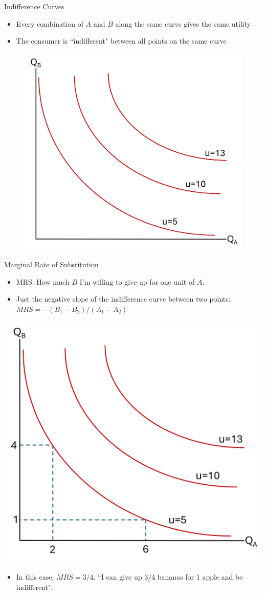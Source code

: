\documentclass[9pt, handout]{beamer}
\begin{document}
\begin{frame}{Indifference Curves}
    \begin{itemize}
        \item Every combination of $A$ and $B$ along the same curve gives the same utility
        \item The consumer is ``indifferent" between all points on the same curve
    \end{itemize}
    \begin{figure}
        \centering
        \includegraphics[width=0.5\linewidth]{indifference_curves.png}
    \end{figure}
\end{frame}

\begin{frame}{Marginal Rate of Substitution}
    \begin{itemize}
        \item MRS:  How much $B$ I'm willing to give up for one unit of $A$.
        \item Just the negative slope of the indifference curve between two points:\\$MRS = -(B_1 - B_2)/(A_1 - A_2)$
    \end{itemize}
    \centering
    \includegraphics[width=0.5\linewidth]{mrs.png}
    \begin{itemize}
        \item In this case, $MRS = 3/4$.  ``I can give up 3/4 bananas for 1 apple and be indifferent".
    \end{itemize}
\end{frame}
\end{document}
